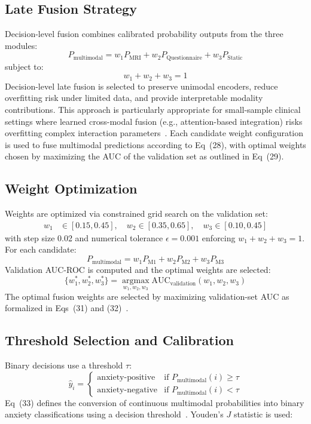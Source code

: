 \documentclass[10pt,letterpaper]{article}
\begin{document}
\subsection*{Late Fusion Strategy}

Decision-level fusion combines calibrated probability outputs from the three modules:
\begin{equation}
P_{\text{multimodal}} = w_1 P_{\text{MRI}} + w_2 P_{\text{Questionnaire}} + w_3 P_{\text{Static}}
\end{equation}
subject to:
\begin{equation}
w_1+w_2+w_3=1
\end{equation}
Decision-level late fusion is selected to preserve unimodal encoders, reduce overfitting risk under limited data, and provide interpretable modality contributions. This approach is particularly appropriate for small-sample clinical settings where learned cross-modal fusion (e.g., attention-based integration) risks overfitting complex interaction parameters~\cite{ref47}. Each candidate weight configuration is used to fuse multimodal predictions according to Eq~(28), with optimal weights chosen by maximizing the AUC of the validation set as outlined in Eq~(29).

\subsection*{Weight Optimization}
Weights are optimized via constrained grid search on the validation set:
\begin{align}
w_1 &\in [0.15,0.45],\quad
w_2 \in [0.35,0.65],\quad
w_3 \in [0.10,0.45]
\end{align}
with step size 0.02 and numerical tolerance $\epsilon=0.001$ enforcing $w_1+w_2+w_3=1$. For each candidate:
\begin{equation}
P_{\text{multimodal}} = w_1 P_{\text{M1}} + w_2 P_{\text{M2}} + w_3 P_{\text{M3}}
\end{equation}
Validation AUC-ROC is computed and the optimal weights are selected:
\begin{equation} \{w_1^*, w_2^*, w_3^*\} = \operatorname*{argmax}_{w_1,w_2,w_3}\text{AUC}_{\text{validation}}(w_1,w_2,w_3) \end{equation}
The optimal fusion weights are selected by maximizing validation-set AUC as formalized in Eqs~(31) and (32)~\cite{ref59}.

\subsection*{Threshold Selection and Calibration}
Binary decisions use a threshold $\tau$:
\begin{equation}
\hat{y}_i =
\begin{cases}
\text{anxiety-positive} & \text{if } P_{\text{multimodal}}(i)\ge \tau\\
\text{anxiety-negative} & \text{if } P_{\text{multimodal}}(i)< \tau
\end{cases}
\end{equation}
Eq~(33) defines the conversion of continuous multimodal probabilities into binary anxiety classifications using a decision threshold~\cite{ref60}.
Youden's $J$ statistic is used:
\end{document}
